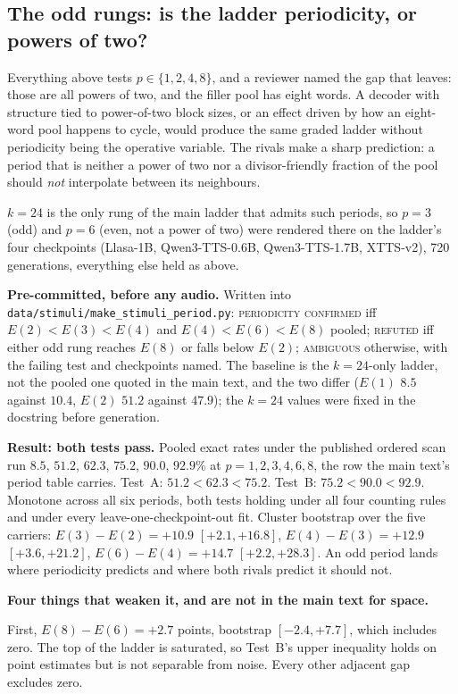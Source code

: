 \documentclass[11pt]{article}
\begin{document}
\subsection{The odd rungs: is the ladder periodicity, or powers of two?}

Everything above tests $p \in \{1, 2, 4, 8\}$, and a reviewer named the gap that
leaves: those are all powers of two, and the filler pool has eight words. A
decoder with structure tied to power-of-two block sizes, or an effect driven by
how an eight-word pool happens to cycle, would produce the same graded ladder
without periodicity being the operative variable. The rivals make a sharp
prediction: a period that is neither a power of two nor a divisor-friendly
fraction of the pool should \emph{not} interpolate between its neighbours.

$k{=}24$ is the only rung of the main ladder that admits such periods, so
$p{=}3$ (odd) and $p{=}6$ (even, not a power of two) were rendered there on the
ladder's four checkpoints (Llasa-1B, Qwen3-TTS-0.6B, Qwen3-TTS-1.7B, XTTS-v2),
720 generations, everything else held as above.

\textbf{Pre-committed, before any audio.} Written into
\texttt{data/stimuli/make\_stimuli\_period.py}: \textsc{periodicity confirmed}
iff $E(2) < E(3) < E(4)$ and $E(4) < E(6) < E(8)$ pooled; \textsc{refuted} iff
either odd rung reaches $E(8)$ or falls below $E(2)$; \textsc{ambiguous}
otherwise, with the failing test and checkpoints named. The baseline is the
$k{=}24$-only ladder, not the pooled one quoted in the main text, and the two
differ ($E(1)$ $8.5$ against $10.4$, $E(2)$ $51.2$ against $47.9$); the $k{=}24$
values were fixed in the docstring before generation.

\textbf{Result: both tests pass.} Pooled exact rates under the published ordered
scan run $8.5$, $51.2$, $62.3$, $75.2$, $90.0$, $92.9\%$ at
$p = 1, 2, 3, 4, 6, 8$, the row the main text's period table carries.
Test~A: $51.2 < 62.3 < 75.2$. Test~B:
$75.2 < 90.0 < 92.9$. Monotone across all six periods, both tests holding under
all four counting rules and under every leave-one-checkpoint-out fit. Cluster
bootstrap over the five carriers: $E(3)-E(2) = +10.9$ $[+2.1, +16.8]$,
$E(4)-E(3) = +12.9$ $[+3.6, +21.2]$, $E(6)-E(4) = +14.7$ $[+2.2, +28.3]$. An odd
period lands where periodicity predicts and where both rivals predict it should
not.

\textbf{Four things that weaken it, and are not in the main text for space.}

First, $E(8) - E(6) = +2.7$ points, bootstrap $[-2.4, +7.7]$, which includes
zero. The top of the ladder is saturated, so Test~B's upper inequality holds on
point estimates but is not separable from noise. Every other adjacent gap
excludes zero.
\end{document}
